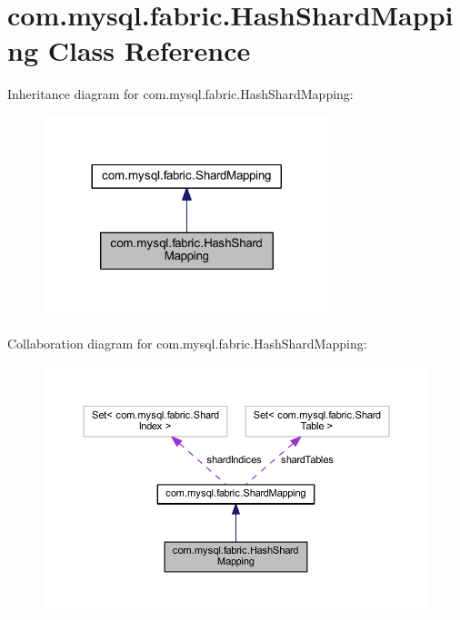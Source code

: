 \hypertarget{classcom_1_1mysql_1_1fabric_1_1_hash_shard_mapping}{}\section{com.\+mysql.\+fabric.\+Hash\+Shard\+Mapping Class Reference}
\label{classcom_1_1mysql_1_1fabric_1_1_hash_shard_mapping}


Inheritance diagram for com.\+mysql.\+fabric.\+Hash\+Shard\+Mapping\+:\nopagebreak
\begin{figure}[H]
\begin{center}
\leavevmode
\includegraphics[width=236pt]{classcom_1_1mysql_1_1fabric_1_1_hash_shard_mapping__inherit__graph}
\end{center}
\end{figure}


Collaboration diagram for com.\+mysql.\+fabric.\+Hash\+Shard\+Mapping\+:\nopagebreak
\begin{figure}[H]
\begin{center}
\leavevmode
\includegraphics[width=350pt]{classcom_1_1mysql_1_1fabric_1_1_hash_shard_mapping__coll__graph}
\end{center}
\end{figure}
